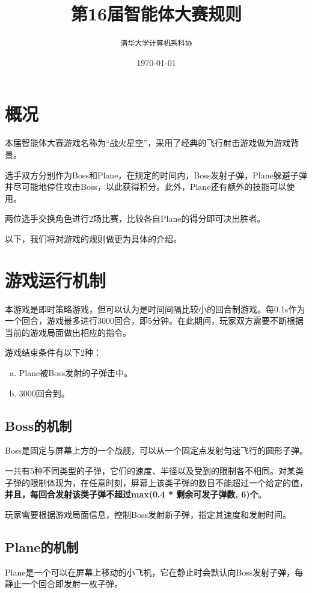 \documentclass[11pt,a4paper]{article}
\begin{document}
\title{\textbf{第16届智能体大赛规则}}
\author{\texttt{清华大学计算机系科协}}
\date{\today}
\maketitle
\thispagestyle{empty}

\section{概况}
本届智能体大赛游戏名称为``战火星空''，采用了经典的飞行射击游戏做为游戏背景。

选手双方分别作为Boss和Plane，在规定的时间内，Boss发射子弹，Plane躲避子弹并尽可能地停住攻击Boss，以此获得积分。此外，Plane还有额外的技能可以使用。

两位选手交换角色进行2场比赛，比较各自Plane的得分即可决出胜者。

以下，我们将对游戏的规则做更为具体的介绍。

\section{游戏运行机制}
本游戏是即时策略游戏，但可以认为是时间间隔比较小的回合制游戏。每0.1s作为一个回合，游戏最多进行3000回合，即5分钟。在此期间，玩家双方需要不断根据当前的游戏局面做出相应的指令。

游戏结束条件有以下2种：
\begin{enumerate}[(a)]
\item Plane被Boss发射的子弹击中。
\item 3000回合到。
\end{enumerate}

\subsection{Boss的机制}
Boss是固定与屏幕上方的一个战舰，可以从一个固定点发射匀速飞行的圆形子弹。

一共有5种不同类型的子弹，它们的速度、半径以及受到的限制各不相同。对某类子弹的限制体现为，在任意时刻，屏幕上该类子弹的数目不能超过一个给定的值，\textbf{并且，每回合发射该类子弹不超过max(0.4 * 剩余可发子弹数, 6)个}。

玩家需要根据游戏局面信息，控制Boss发射新子弹，指定其速度和发射时间。

\subsection{Plane的机制}
Plane是一个可以在屏幕上移动的小飞机，它在静止时会默认向Boss发射子弹，每静止一个回合即发射一枚子弹。
\end{document}
